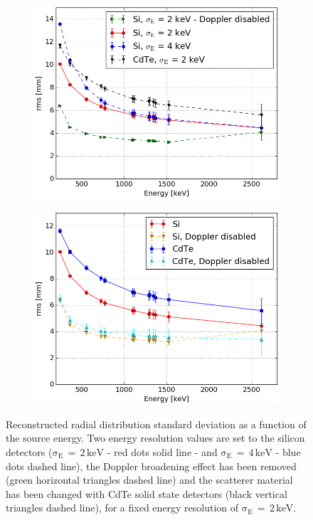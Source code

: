 \begin{figure}
\begin{subfigure}[t]{.5\textwidth}
\centering
\includegraphics[width=\linewidth]{03_GraphicFiles/chapter5_SPECTsimu/SPECT/compton/ENC/rmsVSenergy_ENCstudy_Doppler} 
\caption{}
\label{chap5::subfig::ENCSi}
\end{subfigure}
\begin{subfigure}[t]{.5\textwidth}
\centering
\includegraphics[width=\linewidth]{03_GraphicFiles/chapter5_SPECTsimu/SPECT/compton/ENC/rmsVSenergy_ENCstudy_Doppler_CdTe} 
\caption{}
\label{chap5::subfig::ENCSi}
\end{subfigure}
\caption{Reconstructed radial distribution standard deviation as a function of the source energy. Two energy resolution values are set to the silicon detectors ($\mathrm{\sigma_{E}\,=\,2\,keV}$ - red dots solid line - and $\mathrm{\sigma_{E}\,=\,4\,keV}$ - blue dots dashed line), the Doppler broadening effect has been removed (green horizontal triangles dashed line) and the scatterer material has been changed with CdTe solid state detectors (black vertical triangles dashed line), for a fixed energy resolution of $\mathrm{\sigma_{E}\,=\,2\,keV}$.}
\label{chap5::fig::ENC_study}
\end{figure}      
     
